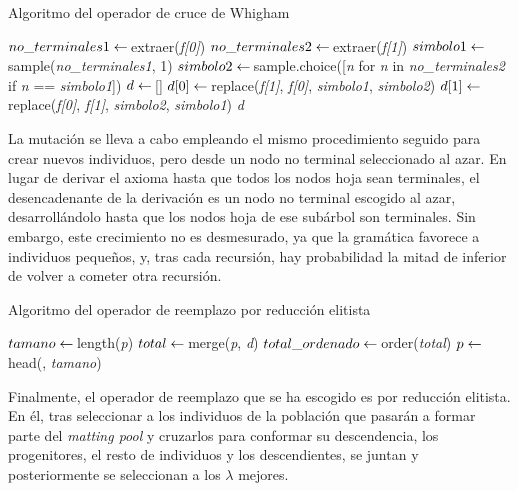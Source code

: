 \documentclass[spanish,a4paper,12pt,twoside]{report}
\begin{document}
  \begin{algorithm}[H]
    \caption{Algoritmo del operador de cruce de Whigham}\label{cruzop}
    \begin{algorithmic}[1]
       
        \State $no\_terminales1 \gets \thinspace $extraer(\textit{f[0]}) 
        \State $no\_terminales2 \gets \thinspace $extraer(\textit{f[1]})
        \State $simbolo1 \gets \thinspace $sample(\textit{no\_terminales1}, 1)
        \State $simbolo2 \gets \thinspace $sample.choice([\textit{n} for \textit{n} in \textit{no\_terminales2} if \textit{n} == \textit{simbolo1}])
        \State $d \gets \thinspace $[] 
        \State $d[0] \gets \thinspace $replace(\textit{f[1]}, \textit{f[0]}, \textit{simbolo1}, \textit{simbolo2})
        \State $d[1] \gets \thinspace $replace(\textit{f[0]}, \textit{f[1]}, \textit{simbolo2}, \textit{simbolo1})
        \State \Return \textit{d}
      \EndFunction
    \end{algorithmic}
  \end{algorithm}
  La mutación se lleva a cabo empleando el mismo procedimiento seguido para crear nuevos individuos, pero desde un nodo no terminal seleccionado al azar. En lugar de derivar el axioma hasta que todos los nodos hoja sean terminales, el desencadenante de la derivación es un nodo no terminal escogido al azar, desarrollándolo hasta que los nodos hoja de ese subárbol son terminales. Sin embargo, este crecimiento no es desmesurado, ya que la gramática favorece a individuos pequeños, y, tras cada recursión, hay probabilidad la mitad de inferior de volver a cometer otra recursión. \par
  \begin{algorithm}[H]
    \caption{Algoritmo del operador de reemplazo por reducción elitista}\label{reemop}
    \begin{algorithmic}[1]
       
        \State $tamano \gets \thinspace $length(\textit{p})
        \State $total \gets \thinspace $merge(\textit{p}, \textit{d})
        \State $total\_ordenado \gets \thinspace $order(\textit{total})
        \State $p \gets \thinspace $head(, \textit{tamano})
      \EndFunction
    \end{algorithmic}
  \end{algorithm}
  Finalmente, el operador de reemplazo que se ha escogido es por reducción elitista. En él, tras seleccionar a los individuos de la población que pasarán a formar parte del \emph{matting pool} y cruzarlos para conformar su descendencia, los progenitores, el resto de individuos y los descendientes, se juntan y posteriormente se seleccionan a los $\lambda$ mejores. \par
\end{document}
